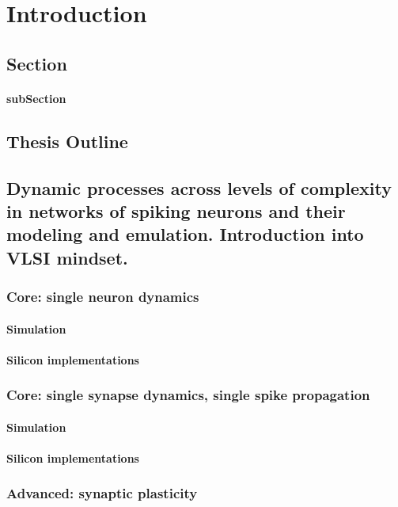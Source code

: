 \chapter{Introduction}
\label{chapter:introduction}
\section{Section}
\subsubsection{subSection}
\section{Thesis Outline} %

\section{Dynamic processes across levels of complexity in networks of spiking neurons and their modeling and emulation. Introduction into VLSI mindset.}
\subsection{Core: single neuron dynamics}
\subsubsection{Simulation}
\subsubsection{Silicon implementations}
\subsection{Core: single synapse dynamics, single spike propagation}
\subsubsection{Simulation}
\subsubsection{Silicon implementations}
\subsection{Advanced: synaptic plasticity}

